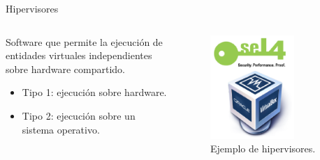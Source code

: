 \documentclass[serif, aspectratio=169]{beamer}
\begin{document}
\begin{frame}{Hipervisores}
    \begin{columns}
        \begin{column}{0.4\textwidth}
            Software que permite la ejecución de entidades virtuales independientes sobre hardware compartido.
            \vspace{0.5cm}
            \begin{itemize}
                \item Tipo 1: ejecución sobre hardware. %
                \item Tipo 2: ejecución sobre un sistema operativo. %
            

            \end{itemize}
        \end{column}

        \begin{column}{0.4\textwidth}
            \begin{figure}
                \centering
                \includegraphics[width=0.7\textwidth]{images/hyperv.png}
                \caption{Ejemplo de hipervisores.} 
            \end{figure}
        \end{column}
    \end{columns}
\end{frame}
\end{document}
